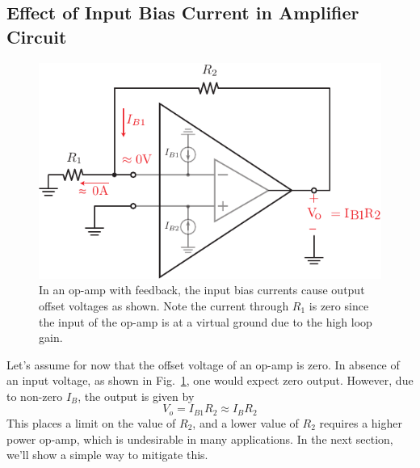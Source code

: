 \subsection{Effect of Input Bias Current in Amplifier Circuit}
\begin{figure}[tb]
\centering
\includegraphics[scale=1]{opamp_offset_i2v}
\caption{In an op-amp with feedback, the input bias currents cause output offset voltages as shown.  Note the current through $R_1$ is zero since the input of the op-amp is at a virtual ground due to the high loop gain.}
\label{fig:opamp_offset_i2v}
\end{figure}
Let's assume for now that the offset voltage of an op-amp is zero.  In absence of an input voltage, as shown in Fig.~\ref{fig:opamp_offset_i2v}, one would expect zero output.  However, due to non-zero $I_B$, the output is given by
\begin{equation}
      V_o = I_{B1} R_2 \approx I_B R_2 
      \label{eq:off1}
\end{equation}
This places a limit on the value of $R_2$, and a lower value of $R_2$ requires a higher power op-amp, which is undesirable in many applications.  In the next section, we'll show a simple way to mitigate this.
